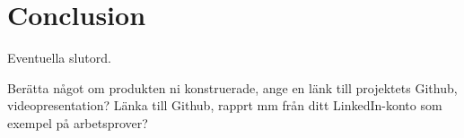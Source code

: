 \section*{Conclusion}
Eventuella slutord.

Berätta något om produkten ni konstruerade, ange en länk till projektets Github\cite{Eklund:2}, videopresentation?
Länka till Github, rapprt mm från ditt LinkedIn-konto som exempel på arbetsprover?\cite{DUMMY:1}
